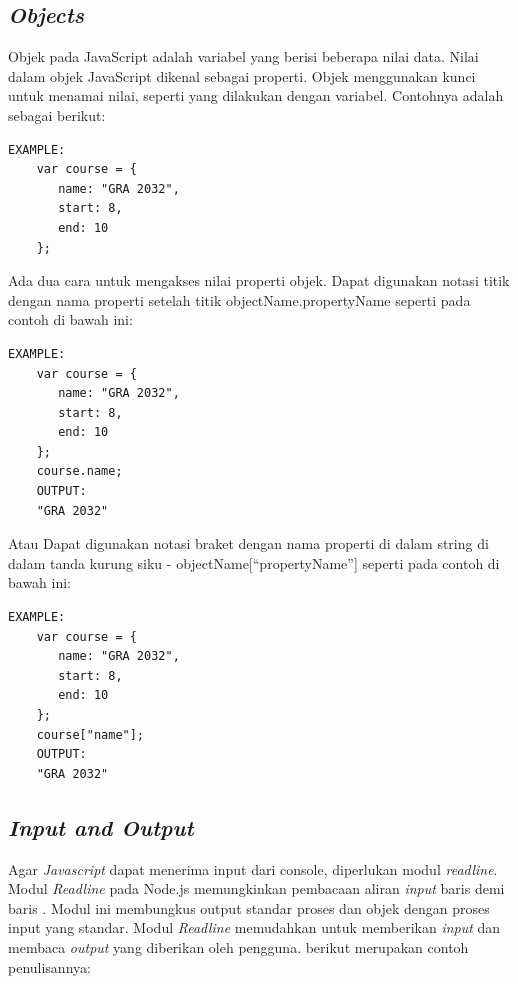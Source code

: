 \subsection{\textit{Objects}}
\label{sec: Objects}
Objek pada JavaScript adalah variabel yang berisi beberapa nilai data. Nilai dalam objek JavaScript dikenal sebagai properti\cite{javascriptlearn}. Objek menggunakan kunci untuk menamai nilai, seperti yang dilakukan dengan variabel. Contohnya adalah sebagai berikut: 
    \begin{lstlisting}[basicstyle=\ttfamily, frame=single,
    columns=fullflexible, breaklines=true, numbers=none]
    EXAMPLE:
    var course = {
       name: "GRA 2032",
       start: 8,
       end: 10
    };
    \end{lstlisting}
    Ada dua cara untuk mengakses nilai properti objek. Dapat digunakan notasi titik dengan nama properti setelah titik objectName.propertyName seperti pada contoh di bawah ini:
    \begin{lstlisting}[basicstyle=\ttfamily, frame=single,
    columns=fullflexible, breaklines=true, numbers=none]
    EXAMPLE:
    var course = {
       name: "GRA 2032",
       start: 8,
       end: 10
    };
    course.name;
    OUTPUT:
    "GRA 2032"
    \end{lstlisting}
    Atau Dapat digunakan notasi braket dengan nama properti di dalam string di dalam tanda kurung siku - objectName[“propertyName”] seperti pada contoh di bawah ini:
    \begin{lstlisting}[basicstyle=\ttfamily, frame=single,
    columns=fullflexible, breaklines=true, numbers=none]
    EXAMPLE:
    var course = {
       name: "GRA 2032",
       start: 8,
       end: 10
    };
    course["name"];
    OUTPUT:
    "GRA 2032"
    \end{lstlisting}
    
\subsection{\textit{Input and Output}}
\label{sec: Input and Output}

Agar \textit{Javascript} dapat menerima input dari console, diperlukan modul \textit{readline}. Modul \textit{Readline} pada Node.js memungkinkan pembacaan aliran \textit{input} baris demi baris \cite{readline}. Modul ini membungkus output standar proses dan objek dengan proses input yang standar. Modul \textit{Readline} memudahkan untuk memberikan \textit{input} dan membaca \textit{output} yang diberikan oleh pengguna. berikut merupakan contoh penulisannya: 

